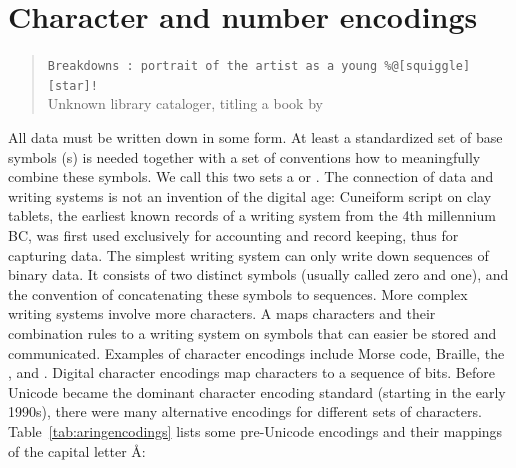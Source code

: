 \section{Character and number encodings}
\label{sec:characters}

\begin{quotation}%
\verb|Breakdowns : portrait of the artist as a young %@[squiggle][star]!| \\
\quotationsource
Unknown library cataloger, titling a book by 
\end{quotation}


\noindent All data must be written down in some form. At least a standardized
set of base symbols (s) is needed together with a set of
conventions how to meaningfully combine these symbols. We call this two sets a
 or .  The connection of data and writing
systems is not an invention of the digital age: Cuneiform script on clay
tablets, the earliest known records of a writing system from the 4th millennium
BC, was first used exclusively for accounting and record keeping, thus for
capturing data.  The simplest writing system can only write down sequences of
binary data. It consists of two distinct symbols (usually called zero and one),
and the convention of concatenating these symbols to sequences. More complex
writing systems involve more characters. A  maps
characters and their combination rules to a writing system on symbols that can
easier be stored and communicated. Examples of character encodings include
Morse code, Braille, the , and . Digital character encodings map
characters to a sequence of bits. Before Unicode became the dominant character
encoding standard (starting in the early 1990s), there were many alternative
encodings for different sets of characters. Table~\ref{tab:aringencodings}
lists some pre-Unicode encodings and their mappings of the capital letter
\r{A}:


